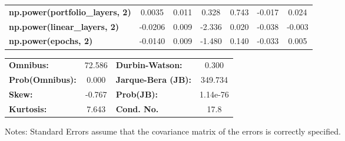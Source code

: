 \begin{center}
\begin{tabular}{lcccccc}
\textbf{np.power(portfolio\_layers, 2)}    &       0.0035  &        0.011     &     0.328  &         0.743        &       -0.017    &        0.024     \\
\textbf{np.power(linear\_layers, 2)}       &      -0.0206  &        0.009     &    -2.336  &         0.020        &       -0.038    &       -0.003     \\
\textbf{np.power(epochs, 2)}               &      -0.0140  &        0.009     &    -1.480  &         0.140        &       -0.033    &        0.005     \\
\bottomrule
\end{tabular}
\begin{tabular}{lclc}
\textbf{Omnibus:}       & 72.586 & \textbf{  Durbin-Watson:     } &    0.300  \\
\textbf{Prob(Omnibus):} &  0.000 & \textbf{  Jarque-Bera (JB):  } &  349.734  \\
\textbf{Skew:}          & -0.767 & \textbf{  Prob(JB):          } & 1.14e-76  \\
\textbf{Kurtosis:}      &  7.643 & \textbf{  Cond. No.          } &     17.8  \\
\bottomrule
\end{tabular}
\end{center}

Notes: \newline
 [1] Standard Errors assume that the covariance matrix of the errors is correctly specified.
